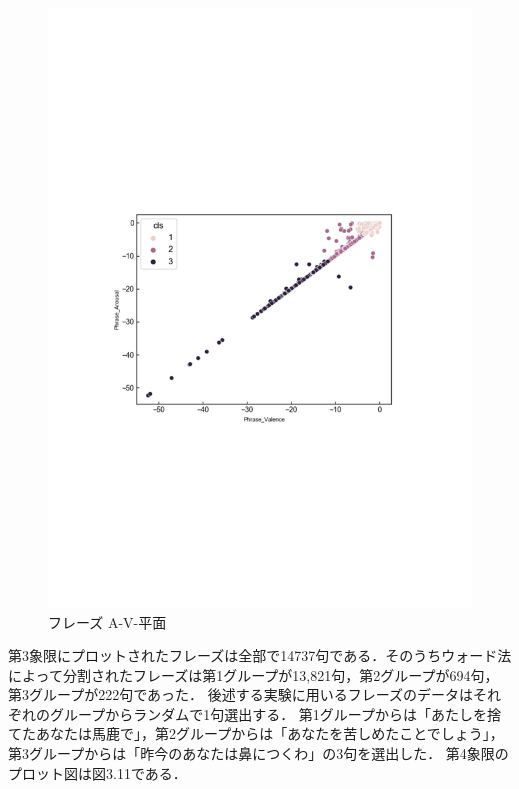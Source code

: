 \begin{figure}[H]
    \centering
    \includegraphics[width=14cm]{phrase_A-V-.pdf}
    \vspace{-1mm}
    \caption{フレーズ A-V-平面}
    \label{fig:mms}
    \vspace{5mm}
\end{figure}
第3象限にプロットされたフレーズは全部で14737句である．そのうちウォード法によって分割されたフレーズは第1グループが13,821句，第2グループが694句，第3グループが222句であった．
後述する実験に用いるフレーズのデータはそれぞれのグループからランダムで1句選出する．
第1グループからは「あたしを捨てたあなたは馬鹿で」，第2グループからは「あなたを苦しめたことでしょう」，第3グループからは「昨今のあなたは鼻につくわ」の3句を選出した．
\newpage
第4象限のプロット図は図3.11である．
